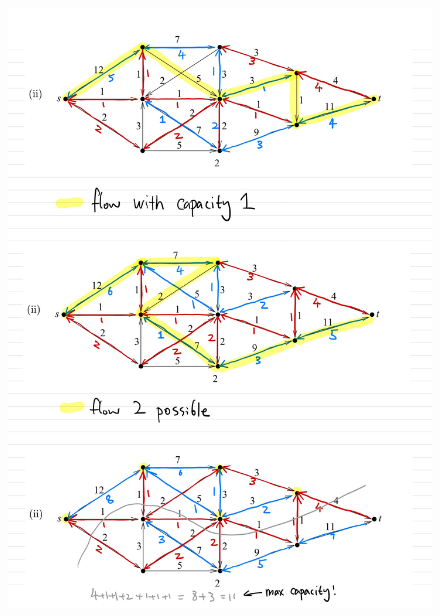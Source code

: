 \documentclass[]{article}
\theoremstyle{definition}
\begin{document}
    \newpage
    \begin{figure}
        \centering
        \includegraphics[width=16cm]{HW6-9.jpg}    
    \end{figure}
    
\end{document}
